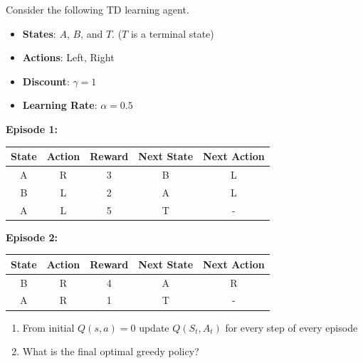 \begin{exerciseboxpaper}
Consider the following TD learning agent. 
\begin{itemize}
    \item {\bf States}: $A$, $B$, and $T$. ($T$ is a terminal state)
    \item {\bf Actions}: Left, Right
    \item {\bf Discount}: $\gamma=1$
    \item {\bf Learning Rate}: $\alpha=0.5$
\end{itemize}

\vspace{0.5\baselineskip}

\textbf{Episode 1:}
\vspace{0.5\baselineskip}

\renewcommand{\arraystretch}{1.25}
\begin{tabular}{c|c|c|c|c}
{\bf State} & {\bf Action} & {\bf Reward} & {\bf Next State} & {\bf Next Action}\\ \hline
A & R & 3 & B & L \\
B & L & 2 & A & L \\
A & L & 5 & T & - \\
\end{tabular}

\vspace{0.5\baselineskip}

\textbf{Episode 2:}

\vspace{0.5\baselineskip}

\renewcommand{\arraystretch}{1.25}
\begin{tabular}{c|c|c|c|c}
{\bf State} & {\bf Action} & {\bf Reward} & {\bf Next State} & {\bf Next Action}\\ \hline
B & R & 4 & A & R \\
A & R & 1 & T & - \\
\end{tabular}

\vspace{0.5\baselineskip}

\begin{enumerate}
   \item From initial $Q(s, a) = 0$ update $Q(S_t, A_t)$ for every step of every episode
   \item What is the final optimal greedy policy?
\end{enumerate}
\end{exerciseboxpaper}

